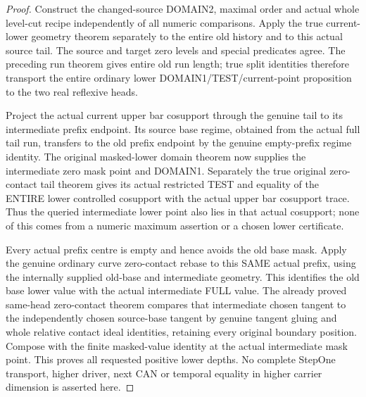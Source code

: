 \begin{proof}
Construct the changed-source DOMAIN2, maximal order and actual whole
level-cut recipe independently of all numeric comparisons. Apply the true
current-lower geometry theorem separately to the entire old history and
to this actual source tail. The source and target zero levels and special
predicates agree. The preceding run theorem gives entire old run length;
true split identities therefore transport the entire ordinary lower
DOMAIN1/TEST/current-point proposition to the two real reflexive heads.

Project the actual current upper bar cosupport through the genuine tail
to its intermediate prefix endpoint. Its source base regime, obtained
from the actual full tail run, transfers to the old prefix endpoint by the
genuine empty-prefix regime identity. The original masked-lower domain
theorem now supplies the intermediate zero mask point and DOMAIN1.
Separately the true original zero-contact tail theorem gives its actual
restricted TEST and equality of the ENTIRE lower controlled cosupport
with the actual upper bar cosupport trace. Thus the queried intermediate
lower point also lies in that actual cosupport; none of this comes from
a numeric maximum assertion or a chosen lower certificate.

Every actual prefix centre is empty and hence avoids the old base mask.
Apply the genuine ordinary curve zero-contact rebase to this SAME actual
prefix, using the internally supplied old-base and intermediate geometry.
This identifies the old base lower value with the actual intermediate
FULL value. The already proved same-head zero-contact theorem compares
that intermediate chosen tangent to the independently chosen source-base
tangent by genuine tangent gluing and whole relative contact ideal
identities, retaining every original boundary position. Compose with the
finite masked-value identity at the actual intermediate mask point. This
proves all requested positive lower depths. No complete StepOne transport,
higher driver, next CAN or temporal equality in higher carrier dimension
is asserted here.
\end{proof}
